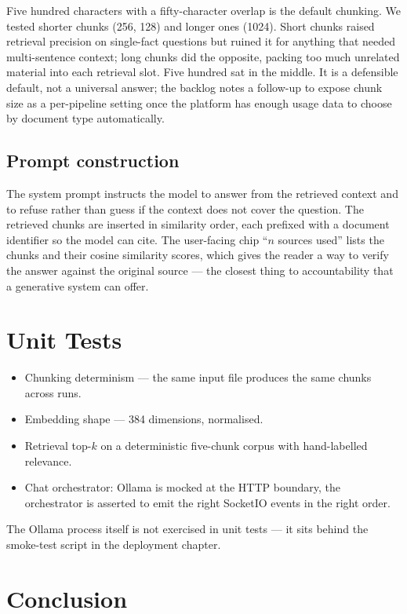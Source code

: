 \documentclass[12pt, a4paper, oneside]{report}
\begin{document}
Five hundred characters with a fifty-character overlap is the
default chunking. We tested shorter chunks (256, 128) and longer
ones (1024). Short chunks raised retrieval precision on single-fact
questions but ruined it for anything that needed multi-sentence
context; long chunks did the opposite, packing too much unrelated
material into each retrieval slot. Five hundred sat in the middle.
It is a defensible default, not a universal answer; the backlog
notes a follow-up to expose chunk size as a per-pipeline setting
once the platform has enough usage data to choose by document type
automatically.

\subsection{Prompt construction}

The system prompt instructs the model to answer from the retrieved
context and to refuse rather than guess if the context does not
cover the question. The retrieved chunks are inserted in similarity
order, each prefixed with a document identifier so the model can
cite. The user-facing chip ``$n$ sources used'' lists the chunks and
their cosine similarity scores, which gives the reader a way to
verify the answer against the original source --- the closest thing
to accountability that a generative system can offer.

\section{Unit Tests}

\begin{itemize}
    \item Chunking determinism --- the same input file produces the
        same chunks across runs.
    \item Embedding shape --- 384 dimensions, normalised.
    \item Retrieval top-$k$ on a deterministic five-chunk corpus
        with hand-labelled relevance.
    \item Chat orchestrator: Ollama is mocked at the HTTP boundary,
        the orchestrator is asserted to emit the right SocketIO
        events in the right order.
\end{itemize}

The Ollama process itself is not exercised in unit tests --- it sits
behind the smoke-test script in the deployment chapter.

\section*{Conclusion}
\end{document}
